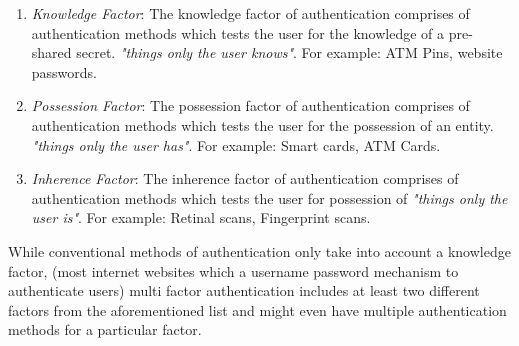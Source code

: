 \documentclass[11pt,oneside]{book}
\begin{document}
\begin{enumerate}
    \item \emph{Knowledge Factor}: The knowledge factor of authentication comprises of
        authentication methods which tests the user for the knowledge of a pre-shared secret.
        \emph{"things only the user knows"}. For example: ATM Pins, website passwords.
    \item \emph{Possession Factor}: The possession factor of authentication comprises of
        authentication methods which tests the user for the possession of an entity.
        \emph{"things only the user has"}. For example: Smart cards, ATM Cards.
    \item \emph{Inherence Factor}: The inherence factor of authentication comprises of
        authentication methods which tests the user for possession of \emph{"things only
        the user is"}. For example: Retinal scans, Fingerprint scans.
\end{enumerate}

While conventional methods of authentication only take into account a knowledge factor,
(most internet websites which a username password mechanism to authenticate users)
multi factor authentication includes at least two different factors from the aforementioned
list and might even have multiple authentication methods for a particular factor.
\end{document}
